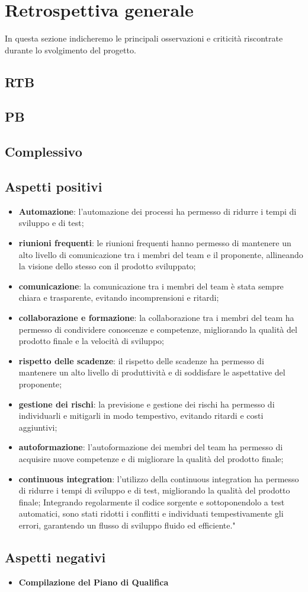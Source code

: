\section{Retrospettiva generale}
In questa sezione indicheremo le principali osservazioni e criticità riscontrate durante lo svolgimento del progetto. 

\subsection{RTB}

\subsection{PB}

\subsection{Complessivo}

\subsection{Aspetti positivi}
\begin{itemize}
    \item \textbf{Automazione}: l'automazione dei processi ha permesso di ridurre i tempi di sviluppo e di test;
    \item \textbf{riunioni frequenti}: le riunioni frequenti hanno permesso di mantenere un alto livello di comunicazione tra i membri del team e il proponente, allineando la visione dello stesso con il prodotto sviluppato;
    \item \textbf{comunicazione}: la comunicazione tra i membri del team è stata sempre chiara e trasparente, evitando incomprensioni e ritardi;
    \item \textbf{collaborazione e formazione}: la collaborazione tra i membri del team ha permesso di condividere conoscenze e competenze, migliorando la qualità del prodotto finale e la velocità di sviluppo;
    \item \textbf{rispetto delle scadenze}: il rispetto delle scadenze ha permesso di mantenere un alto livello di produttività e di soddisfare le aspettative del proponente;
    \item \textbf{gestione dei rischi}: la previsione e gestione dei rischi ha permesso di individuarli e mitigarli in modo tempestivo, evitando ritardi e costi aggiuntivi;
    \item \textbf{autoformazione}: l'autoformazione dei membri del team ha permesso di acquisire nuove competenze e di migliorare la qualità del prodotto finale;
    \item \textbf{continuous integration}: l'utilizzo della continuous integration ha permesso di ridurre i tempi di sviluppo e di test, migliorando la qualità del prodotto finale;  Integrando regolarmente il codice sorgente e sottoponendolo a test
    automatici, sono stati ridotti i conflitti e individuati tempestivamente gli errori,
    garantendo un flusso di sviluppo fluido ed efficiente."
\end{itemize}

\subsection{Aspetti negativi}
\begin{itemize}
    \item \textbf{Compilazione del Piano di Qualifica}
\end{itemize}